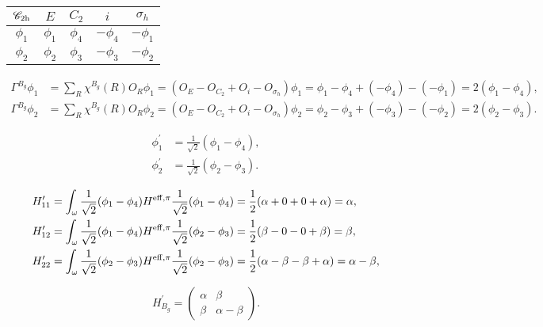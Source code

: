\documentclass[a4paper]{book}
\newcommand{\Heff}{H^{\rm eff,\pi}}
\newcommand{\Hp}{H^\prime}
\begin{document}
\begin{solution}
\begin{enumerate}[label=(\alph*)]
		\begin{center}
		\begin{tabular}{ccccc}\hline
	$\mathscr{C}_{\rm 2h}$ & $E$ & $C_2$ & $i$ & $\sigma_h$ \\ \hline
			$\phi_1$	&	$\phi_1$	&	$\phi_4$	&	$-\phi_4$	&	$-\phi_1$	\\
			$\phi_2$	&	$\phi_2$	&	$\phi_3$	&	$-\phi_3$	&	$-\phi_2$	\\	\hline
		\end{tabular}
		\end{center}
		
		\begin{align*}
		\Gamma^{B_g}\phi_1 &= \sum_{R} \chi^{B_g}(R) O_R \phi_1 = (O_E - O_{C_2} + O_{i} - O_{\sigma_h})\phi_1 = \phi_1 - \phi_4 + (-\phi_4) - (-\phi_1) = 2(\phi_1-\phi_4) , \\
		\Gamma^{B_g}\phi_2 &= \sum_{R} \chi^{B_g}(R) O_R \phi_2 = (O_E - O_{C_2} + O_{i} - O_{\sigma_h})\phi_2 = \phi_2 - \phi_3 + (-\phi_3) - (-\phi_2) = 2(\phi_2-\phi_3) .
		\end{align*}
		
		\begin{align*}
		\phi^\prime_1 &= \frac{1}{\sqrt{2}} (\phi_1-\phi_4) , \\
		\phi^\prime_2 &= \frac{1}{\sqrt{2}} (\phi_2-\phi_3) .
		\end{align*}
		
		\begin{align*}
		\Hp_{11} &= \int_{\omega} \frac{1}{\sqrt{2}}(\phi_1-\phi_4) \Heff \frac{1}{\sqrt{2}}(\phi_1-\phi_4) = \frac{1}{2} (\alpha + 0 + 0 + \alpha) = \alpha, \\
		\Hp_{12} &= \int_{\omega} \frac{1}{\sqrt{2}}(\phi_1-\phi_4) \Heff \frac{1}{\sqrt{2}}(\phi_2-\phi_3) = \frac{1}{2} (\beta - 0 - 0 + \beta) = \beta, \\
		\Hp_{22} &= \int_{\omega} \frac{1}{\sqrt{2}}(\phi_2-\phi_3) \Heff \frac{1}{\sqrt{2}}(\phi_2-\phi_3) = \frac{1}{2} (\alpha - \beta - \beta + \alpha) = \alpha - \beta, \\
		\end{align*}

		\begin{equation*}
			\Hp_{B_g} = \begin{pmatrix}
				\alpha	&	\beta \\ \beta & \alpha - \beta 
			\end{pmatrix}.
		\end{equation*}
		

\end{enumerate}
\end{solution}
\end{document}
